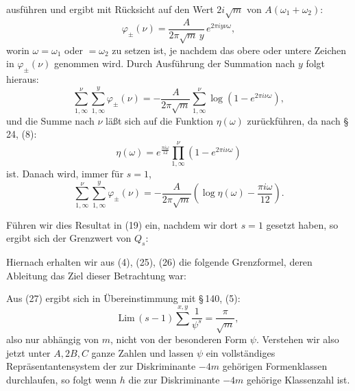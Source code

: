 
ausführen und ergibt mit Rücksicht auf den Wert $2i\sqrt m$ von $A(\omega_1+\omega_2)$:
\[
\varphi_\pm(\nu) = \frac{A}{2\pi\sqrt m\,y}\,e^{2\pi i y\nu\omega},
\]
worin $\omega=\omega_1$ oder $=\omega_2$ zu setzen ist, je nachdem das obere oder untere Zeichen in $\varphi_\pm(\nu)$ genommen wird. Durch Ausführung der Summation nach $y$ folgt hieraus:
\[
\sum_{1,\infty}^{\nu}\sum_{1,\infty}^{y}\varphi_\pm(\nu) = -\frac{A}{2\pi\sqrt m}\sum_{1,\infty}^{\nu}\log\left(1-e^{2\pi i\nu\omega}\right),
\]
und die Summe nach $\nu$ läßt sich auf die Funktion $\eta(\omega)$ zurückführen, da nach \S\,24, (8):
\[
\eta(\omega) = e^{\frac{\pi i \omega}{12}}\prod_{1,\infty}^{\nu}\left(1-e^{2\pi i\nu\omega}\right)
\]
ist. Danach wird, immer für $s=1$,
\[
\sum_{1,\infty}^{\nu}\sum_{1,\infty}^{y}\varphi_\pm(\nu) = -\frac{A}{2\pi\sqrt m}\left(\log\eta(\omega) - \frac{\pi i \omega}{12}\right).
\]

Führen wir dies Resultat in (19) ein, nachdem wir dort $s=1$ gesetzt haben, so ergibt sich der Grenzwert von $Q_s$:

Hiernach erhalten wir aus (4), (25), (26) die folgende Grenzformel, deren Ableitung das Ziel dieser Betrachtung war:

Aus (27) ergibt sich in Übereinstimmung mit \S\,140, (5):
\[
\mathrm{Lim}\,(s-1)\sum^{x,y}\frac{1}{\psi^s} = \frac{\pi}{\sqrt m},
\]
also nur abhängig von $m$, nicht von der besonderen Form $\psi$. Verstehen wir also jetzt unter $A, 2B, C$ ganze Zahlen und lassen $\psi$ ein vollständiges Repräsentantensystem der zur Diskriminante $-4m$ gehörigen Formenklassen durchlaufen, so folgt
wenn $h$ die zur Diskriminante $-4m$ gehörige Klassenzahl ist.
